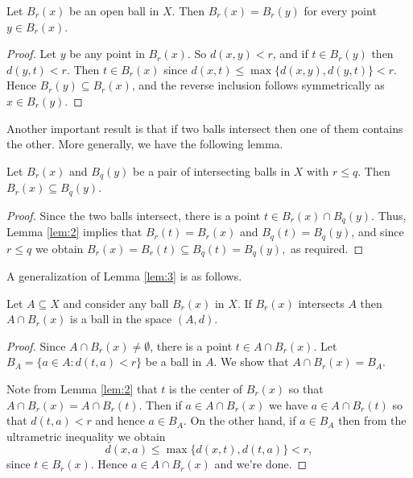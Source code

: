 \begin{lemma}
\label{lem:2}
Let \( B_{r} (x) \) be an open ball in \( X \). Then \( B_{r} (x) = B_{r} (y) \) for every point \( y \in B_{r} (x) \).
\end{lemma}
\begin{proof}
Let \( y \) be any point in \( B_{r} (x) \). So \( d(x,y) < r \), and if \( t \in B_{r}(y) \) then \( d(y,t) < r \). Then \( t \in B_{r} (x) \) since \( d(x,t) \leq \max \{ d(x,y) , d(y,t) \} < r \). Hence \( B_{r} (y) \subseteq B_{r} (x) \), and the reverse inclusion follows symmetrically as \( x \in B_{r} (y) \).
\end{proof}
Another important result is that if two balls intersect then one of them contains the other. More generally, we have the following lemma.
\begin{lemma}
\label{lem:3}
Let \( B_{r} (x) \) and \( B_{q} (y) \) be a pair of intersecting balls in \( X \) with \( r \leq q \). Then \( B_{r} (x) \subseteq B_{q} (y) \).
\end{lemma}
\begin{proof}
	Since the two balls intersect, there is a point \( t \in B_{r} (x) \cap B_{q} (y) \). Thus, Lemma \ref{lem:2} implies that \( B_{r} (t) = B_{r} (x) \) and \( B_{q} (t) = B_{q} (y) \), and since \( r \leq q \) we obtain \( B_{r} (x) = B_{r} (t) \subseteq B_{q} (t) = B_{q} (y), \) as required.
\end{proof}
A generalization of Lemma \ref{lem:3} is as follows.
\begin{lemma}
\label{lem:4}
Let \( A \subseteq X \) and consider any ball \(B_{r } (x) \) in \( X \). If \( B_{r } (x) \) intersects \( A \) then \( A \cap B_{r} (x) \) is a ball in the space \( (A, d) \).
\end{lemma}
\begin{proof}
Since \( A \cap B_{r} (x) \neq \emptyset  \), there is a point \( t \in A \cap B_{r} (x) \). Let \( B_{A} = \{ a \in A : d(t,a) < r \}  \) be a ball in \( A \). We show that \( A \cap B_{r} (x) = B_{A}  \).

Note from Lemma \ref{lem:2} that \( t \) is the center of \( B_{r } (x) \) so that \( A \cap B_{r } (x) = A \cap B_{r } (t) \). Then if \( a \in A \cap B_{r} (x) \) we have \( a \in A \cap B_{r } (t) \) so that \( d(t, a) < r  \) and hence \( a \in B_{A} \). On the other hand, if \( a \in B_{A}  \) then from the ultrametric inequality we obtain \[ d(x, a) \leq \max \{ d(x,t), d(t,a) \} < r , \] since \( t \in B_{r } (x) \). Hence \( a \in A \cap B_{r } (x) \) and we're done.
\end{proof}

